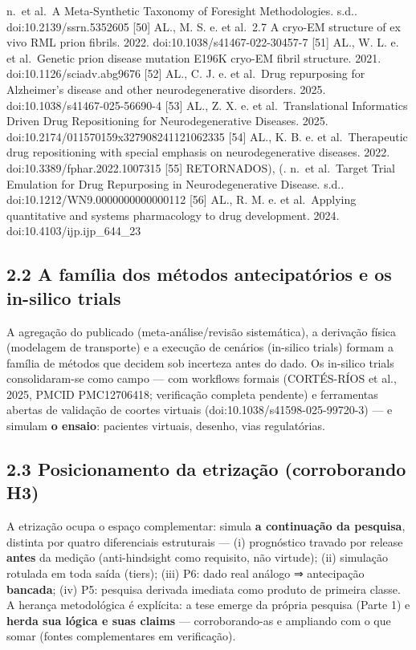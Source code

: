 \documentclass[
  12pt,
]{report}
\begin{document}
n.~et al.~A Meta-Synthetic Taxonomy of Foresight Methodologies. s.d..
doi:10.2139/ssrn.5352605 {[}50{]} AL., M. S. e. et al.~2.7 A cryo-EM
structure of ex vivo RML prion fibrils. 2022.
doi:10.1038/s41467-022-30457-7 {[}51{]} AL., W. L. e. et al.~Genetic
prion disease mutation E196K cryo-EM fibril structure. 2021.
doi:10.1126/sciadv.abg9676 {[}52{]} AL., C. J. e. et al.~Drug
repurposing for Alzheimer's disease and other neurodegenerative
disorders. 2025. doi:10.1038/s41467-025-56690-4 {[}53{]} AL., Z. X. e.
et al.~Translational Informatics Driven Drug Repositioning for
Neurodegenerative Diseases. 2025.
doi:10.2174/011570159x327908241121062335 {[}54{]} AL., K. B. e. et
al.~Therapeutic drug repositioning with special emphasis on
neurodegenerative diseases. 2022. doi:10.3389/fphar.2022.1007315
{[}55{]} RETORNADOS), (. n.~et al.~Target Trial Emulation for Drug
Repurposing in Neurodegenerative Disease. s.d..
doi:10.1212/WN9.0000000000000112 {[}56{]} AL., R. M. e. et al.~Applying
quantitative and systems pharmacology to drug development. 2024.
doi:10.4103/ijp.ijp\_644\_23

\hypertarget{a-famuxedlia-dos-muxe9todos-antecipatuxf3rios-e-os-in-silico-trials}{%
\subsection{2.2 A família dos métodos antecipatórios e os in-silico
trials}\label{a-famuxedlia-dos-muxe9todos-antecipatuxf3rios-e-os-in-silico-trials}}

A agregação do publicado (meta-análise/revisão sistemática), a derivação
física (modelagem de transporte) e a execução de cenários (in-silico
trials) formam a família de métodos que decidem sob incerteza antes do
dado. Os in-silico trials consolidaram-se como campo --- com workflows
formais (CORTÉS-RÍOS et al., 2025, PMCID PMC12706418; verificação
completa pendente) e ferramentas abertas de validação de coortes
virtuais (doi:10.1038/s41598-025-99720-3) --- e simulam \textbf{o
ensaio}: pacientes virtuais, desenho, vias regulatórias.

\hypertarget{posicionamento-da-etrizauxe7uxe3o-corroborando-h3}{%
\subsection{2.3 Posicionamento da etrização (corroborando
H3)}\label{posicionamento-da-etrizauxe7uxe3o-corroborando-h3}}

A etrização ocupa o espaço complementar: simula \textbf{a continuação da
pesquisa}, distinta por quatro diferenciais estruturais --- (i)
prognóstico travado por release \textbf{antes} da medição
(anti-hindsight como requisito, não virtude); (ii) simulação rotulada em
toda saída (tiers); (iii) P6: dado real análogo ⇒ antecipação
\textbf{bancada}; (iv) P5: pesquisa derivada imediata como produto de
primeira classe. A herança metodológica é explícita: a tese emerge da
própria pesquisa (Parte 1) e \textbf{herda sua lógica e suas claims} ---
corroborando-as e ampliando com o que somar (fontes complementares em
verificação).
\end{document}
